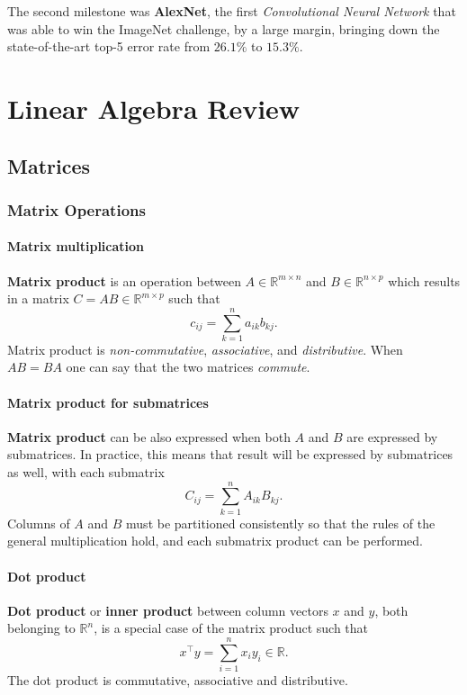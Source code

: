 \documentclass[10pt]{report}
\begin{document}
The second milestone was \textbf{AlexNet}, the first \emph{Convolutional Neural Network}
that was able to win the ImageNet challenge, by a large margin, bringing down
the state-of-the-art top-5 error rate from \(26.1\%\) to \(15.3\%\).
\part{Linear Algebra Review}
\label{sec:orgfa614e9}
\chapter{Matrices}
\label{sec:org3bd84aa}
\section{Matrix Operations}
\label{sec:orgb35702c}
\subsection{Matrix multiplication}
\label{sec:org28c926f}
\textbf{Matrix product} is an operation between \(A \in \mathbb{R}^{m \times n}\) and \(B \in \mathbb{R}^{n \times p}\) which results in a matrix \(C = AB \in \mathbb{R}^{m \times p}\) such that $$c_{ij} = \sum_{k=1}^n a_{ik}b_{kj}.$$ Matrix product is \emph{non\--commutative}, \emph{associative}, and \emph{distributive}. When \(AB = BA\) one can say that the two matrices \emph{commute}.
\subsection{Matrix product for submatrices}
\label{sec:org52027be}
\textbf{Matrix product} can be also expressed when both \(A\) and \(B\) are expressed by submatrices. In practice, this means that result will be expressed by submatrices as well, with each submatrix $$C_{ij} = \sum_{k=1}^n A_{ik}B_{kj}.$$ Columns of \(A\) and \(B\) must be partitioned consistently so that the rules of the general multiplication hold, and each submatrix product can be performed.
\subsection{Dot product}
\label{sec:orgc4fce8f}
\textbf{Dot product} or \textbf{inner product} between column vectors \(x\) and \(y\), both belonging to \(\mathbb{R}^n\), is a special case of the matrix product such that $$x^\top y = \sum_{i=1}^n x_i y_i \in \mathbb R.$$ The dot product is commutative, associative and distributive.
\end{document}
